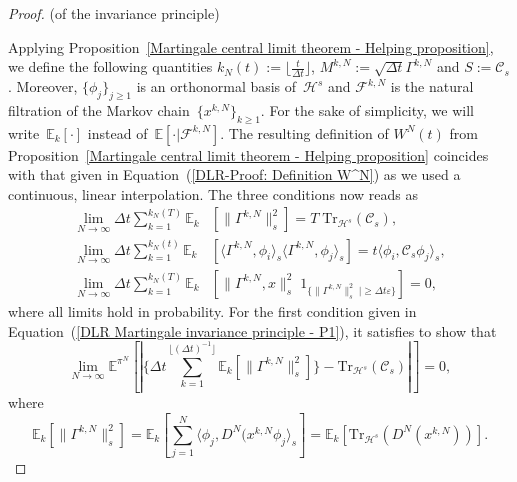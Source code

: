 \begin{proof}(of the invariance principle)
  
  Applying Proposition~\ref{Martingale central limit theorem - Helping proposition}, we define the following quantities $ k_N(t) := \lfloor \frac{t}{\Delta t} \rfloor $, $ M^{k,N} := \sqrt{\Delta t} \Gamma^{k,N} $ and $ S := \mathcal{C}_s $. Moreover, $\{ \phi_j \}_{j \geq 1}$ is an orthonormal basis of~$\mathcal{H}^s$ and $\mathcal{F}^{k,N}$ is the natural filtration of the Markov chain~$ \{ x^{k,N} \} _{k \geq 1}$. For the sake of simplicity, we will write~$\mathbb{E}_k[\cdot]$ instead of~$\mathbb{E}[\cdot |\mathcal{F}^{k,N}]$.  The resulting definition of $ W^{N}(t) $ from Proposition~\ref{Martingale central limit theorem - Helping proposition} coincides with that given in Equation~(\ref{DLR-Proof: Definition W^N}) as we used a continuous, linear interpolation. The three conditions now reads as
    \begin{align}
   \lim_{N \to \infty} \Delta t \sum_{k=1}^{k_{N}(T)} \mathbb{E}_k &\left[ \| \Gamma^{k,N} \|_{s}^{2}  \right] = T \; \text{Tr}_{\mathcal{H}^s}(\mathcal{C}_s), \label{DLR Martingale invariance principle - P1}\\
   \lim_{N \to \infty} \Delta t \sum_{k=1}^{k_{N}(t)} \mathbb{E}_k &\left[ \langle  \Gamma^{k,N} , \phi_i \rangle_{s} \langle  \Gamma^{k,N} , \phi_j \rangle_{s}  \right] = t \langle  \phi_i , \mathcal{C}_s \phi_j \rangle_{s}, \label{DLR Martingale invariance principle  - P2}\\
   \lim_{N \to \infty} \Delta t \sum_{k=1}^{k_{N}(T)} \mathbb{E}_k &\left[\| \Gamma^{k,N} , x \|_{s}^{2} \;  1_{\{ \| \Gamma^{k,N} \|_{s}^{2} \; | \geq \Delta t \varepsilon \}} \right] = 0, \label{DLR Martingale invariance principle  - P3}
  \end{align}
  where all limits hold in probability.  For the first condition given in Equation~(\ref{DLR Martingale invariance principle - P1}), it satisfies to show that
  \begin{equation*}
    \lim_{N \to \infty} \mathbb{E}^{\pi^N} [| \{ \Delta t \sum_{k=1}^{\lfloor (\Delta t)^{-1} \rfloor} \mathbb{E}_k[\| \Gamma^{k,N} \|_s^2] \} - \text{Tr}_{\mathcal{H}^s}(\mathcal{C}_s) |  ] = 0,
  \end{equation*}
  where
  \begin{equation*}
    \mathbb{E}_k[\| \Gamma^{k,N} \|_s^2] = \mathbb{E}_k [ \sum_{j=1}^{N} \langle \phi_j, D^N(x^{k,N}\phi_j \rangle_s  ] = \mathbb{E}_k [ \text{Tr}_{\mathcal{H}^s} (D^N(x^{k,N})) ].
  \end{equation*}

\end{proof}
